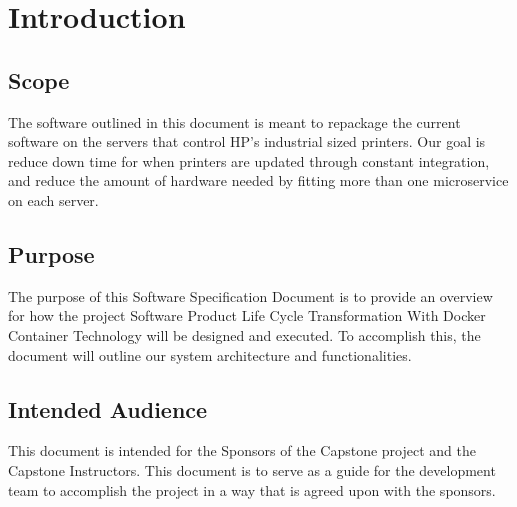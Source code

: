 \documentclass[onecolumn, draftclsnofoot,10pt, compsoc]{IEEEtran}
\begin{document}


\section{Introduction}

\subsection{Scope}

The software outlined in this document is meant to repackage the current software on the servers that control HP’s industrial sized printers. Our goal is reduce down time for when printers are updated through constant integration, and reduce the amount of hardware needed by fitting more than one microservice on each server.


\subsection{Purpose}

The purpose of this Software Specification Document is to provide an overview for how the project Software Product Life Cycle Transformation With Docker Container Technology will be designed and executed. To accomplish this, the document will outline our system architecture and functionalities.


\subsection{Intended Audience}

This document is intended for the Sponsors of the Capstone project and the Capstone Instructors. This document is to serve as a guide for the development team to accomplish the project in a way that is agreed upon with the sponsors.
\end{document}

